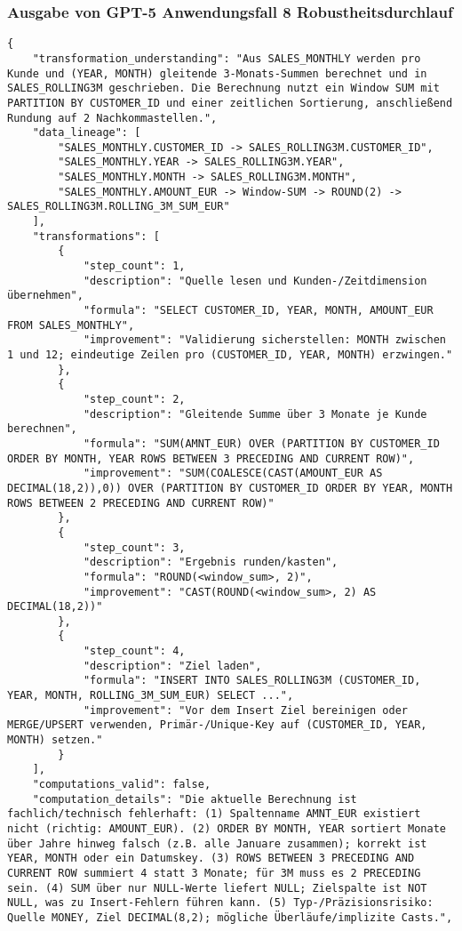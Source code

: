 \subsubsection{Ausgabe von GPT-5 Anwendungsfall 8 Robustheitsdurchlauf}\label{anhang:subsubsec:gpt_case8_prompt3}
\begin{lstlisting}[caption={Ausgabe: GPT-5 Anwendungsfall 8 Robustheitsdurchlauf},label={gpt_case8_prompt3}]
{
    "transformation_understanding": "Aus SALES_MONTHLY werden pro Kunde und (YEAR, MONTH) gleitende 3-Monats-Summen berechnet und in SALES_ROLLING3M geschrieben. Die Berechnung nutzt ein Window SUM mit PARTITION BY CUSTOMER_ID und einer zeitlichen Sortierung, anschließend Rundung auf 2 Nachkommastellen.",
    "data_lineage": [
        "SALES_MONTHLY.CUSTOMER_ID -> SALES_ROLLING3M.CUSTOMER_ID",
        "SALES_MONTHLY.YEAR -> SALES_ROLLING3M.YEAR",
        "SALES_MONTHLY.MONTH -> SALES_ROLLING3M.MONTH",
        "SALES_MONTHLY.AMOUNT_EUR -> Window-SUM -> ROUND(2) -> SALES_ROLLING3M.ROLLING_3M_SUM_EUR"
    ],
    "transformations": [
        {
            "step_count": 1,
            "description": "Quelle lesen und Kunden-/Zeitdimension übernehmen",
            "formula": "SELECT CUSTOMER_ID, YEAR, MONTH, AMOUNT_EUR FROM SALES_MONTHLY",
            "improvement": "Validierung sicherstellen: MONTH zwischen 1 und 12; eindeutige Zeilen pro (CUSTOMER_ID, YEAR, MONTH) erzwingen."
        },
        {
            "step_count": 2,
            "description": "Gleitende Summe über 3 Monate je Kunde berechnen",
            "formula": "SUM(AMNT_EUR) OVER (PARTITION BY CUSTOMER_ID ORDER BY MONTH, YEAR ROWS BETWEEN 3 PRECEDING AND CURRENT ROW)",
            "improvement": "SUM(COALESCE(CAST(AMOUNT_EUR AS DECIMAL(18,2)),0)) OVER (PARTITION BY CUSTOMER_ID ORDER BY YEAR, MONTH ROWS BETWEEN 2 PRECEDING AND CURRENT ROW)"
        },
        {
            "step_count": 3,
            "description": "Ergebnis runden/kasten",
            "formula": "ROUND(<window_sum>, 2)",
            "improvement": "CAST(ROUND(<window_sum>, 2) AS DECIMAL(18,2))"
        },
        {
            "step_count": 4,
            "description": "Ziel laden",
            "formula": "INSERT INTO SALES_ROLLING3M (CUSTOMER_ID, YEAR, MONTH, ROLLING_3M_SUM_EUR) SELECT ...",
            "improvement": "Vor dem Insert Ziel bereinigen oder MERGE/UPSERT verwenden, Primär-/Unique-Key auf (CUSTOMER_ID, YEAR, MONTH) setzen."
        }
    ],
    "computations_valid": false,
    "computation_details": "Die aktuelle Berechnung ist fachlich/technisch fehlerhaft: (1) Spaltenname AMNT_EUR existiert nicht (richtig: AMOUNT_EUR). (2) ORDER BY MONTH, YEAR sortiert Monate über Jahre hinweg falsch (z.B. alle Januare zusammen); korrekt ist YEAR, MONTH oder ein Datumskey. (3) ROWS BETWEEN 3 PRECEDING AND CURRENT ROW summiert 4 statt 3 Monate; für 3M muss es 2 PRECEDING sein. (4) SUM über nur NULL-Werte liefert NULL; Zielspalte ist NOT NULL, was zu Insert-Fehlern führen kann. (5) Typ-/Präzisionsrisiko: Quelle MONEY, Ziel DECIMAL(8,2); mögliche Überläufe/implizite Casts.",

\end{lstlisting}
